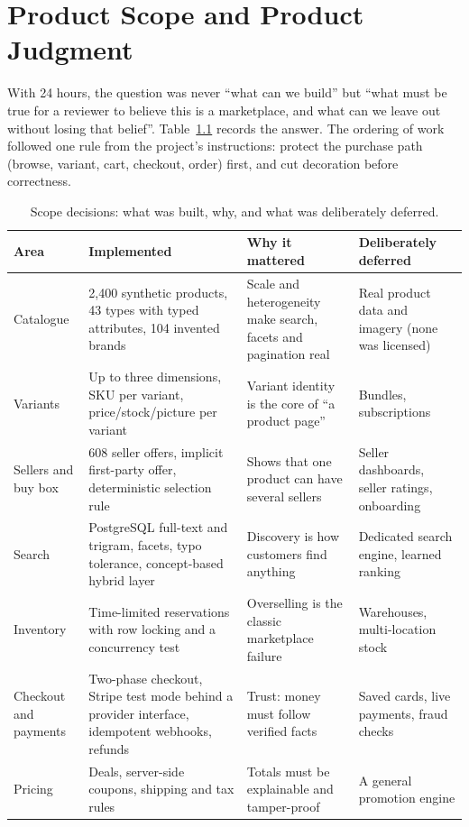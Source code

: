 \chapter{Product Scope and Product Judgment}
\label{ch:scope}

With 24 hours, the question was never ``what can we build'' but ``what must be true for a reviewer to believe this is a marketplace, and what can we leave out without losing that belief''. Table~\ref{tab:scope} records the answer. The ordering of work followed one rule from the project's instructions: protect the purchase path (browse, variant, cart, checkout, order) first, and cut decoration before correctness.

\begin{table}[H]
\centering
\caption{Scope decisions: what was built, why, and what was deliberately deferred.}
\label{tab:scope}
\footnotesize
\begin{tabularx}{\linewidth}{@{}p{2.4cm}XXX@{}}
\toprule
Area & Implemented & Why it mattered & Deliberately deferred \\
\midrule
Catalogue & 2,400 synthetic products, 43 types with typed attributes, 104 invented brands & Scale and heterogeneity make search, facets and pagination real & Real product data and imagery (none was licensed) \\
Variants & Up to three dimensions, SKU per variant, price/stock/picture per variant & Variant identity is the core of ``a product page'' & Bundles, subscriptions \\
Sellers and buy box & 608 seller offers, implicit first-party offer, deterministic selection rule & Shows that one product can have several sellers & Seller dashboards, seller ratings, onboarding \\
Search & PostgreSQL full-text and trigram, facets, typo tolerance, concept-based hybrid layer & Discovery is how customers find anything & Dedicated search engine, learned ranking \\
Inventory & Time-limited reservations with row locking and a concurrency test & Overselling is the classic marketplace failure & Warehouses, multi-location stock \\
Checkout and payments & Two-phase checkout, Stripe test mode behind a provider interface, idempotent webhooks, refunds & Trust: money must follow verified facts & Saved cards, live payments, fraud checks \\
Pricing & Deals, server-side coupons, shipping and tax rules & Totals must be explainable and tamper-proof & A general promotion engine \\

\end{tabularx}
\end{table}
